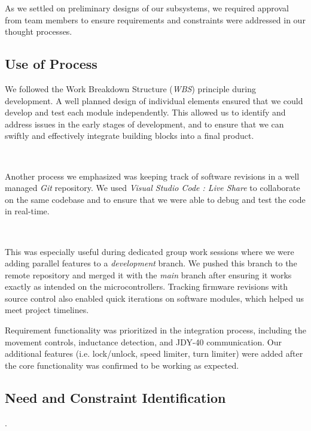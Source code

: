 \documentclass{article}
\begin{document}
As we settled on preliminary designs of our subsystems, we required approval from team members to ensure requirements and constraints were addressed in our thought processes.

\subsection{Use of Process}

We followed the Work Breakdown Structure (\textit{WBS}) principle during development. A well planned design of individual elements ensured that we could
develop and test each module independently. This allowed us to identify and address issues in the early stages of development, and to
ensure that we can swiftly and effectively integrate building blocks into a final product.

\

Another process we emphasized was keeping track of software revisions in a well managed \textit{Git} repository. We used \textit{Visual Studio Code : Live Share}
to collaborate on the same codebase and to ensure that we were able to debug and test the code in real-time.

\

This was especially useful during dedicated group work sessions where we were adding parallel features to a \textit{development} branch. We pushed this branch to the remote repository
and merged it with the \textit{main} branch after ensuring it works exactly as intended on the microcontrollers. Tracking firmware revisions with source control also enabled quick iterations
on software modules, which helped us meet project timelines.

Requirement functionality was prioritized in the integration process, including the movement controls, inductance detection, and JDY-40 communication.
Our additional features (i.e. lock/unlock, speed limiter, turn limiter) were added after the core functionality was confirmed to be working as expected.

\subsection{Need and Constraint Identification}.
\end{document}
